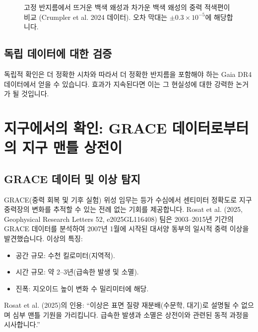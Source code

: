 \documentclass[11pt,a4paper]{article}
\begin{document}
	\begin{figure}[htbp]
		\centering
		\caption{고정 반지름에서 뜨거운 백색 왜성과 차가운 백색 왜성의 중력 적색편이 비교 (Crumpler et al. 2024 데이터). 오차 막대는 $\pm0.3\times10^{-5}$에 해당합니다.}
		\label{fig:wd-redshift}
	\end{figure}
	
	\subsection{독립 데이터에 대한 검증}
	\label{subsec:wd-verification}
	
	독립적 확인은 더 정확한 시차와 따라서 더 정확한 반지름을 포함해야 하는 Gaia DR4 데이터에서 얻을 수 있습니다. 효과가 지속된다면 이는 그 현실성에 대한 강력한 논거가 될 것입니다.
	
	\section{지구에서의 확인: GRACE 데이터로부터의 지구 맨틀 상전이}
	\label{sec:grace}
	
	\subsection{GRACE 데이터 및 이상 탐지}
	\label{subsec:grace-data}
	
	GRACE(중력 회복 및 기후 실험) 위성 임무는 등가 수심에서 센티미터 정확도로 지구 중력장의 변화를 추적할 수 있는 전례 없는 기회를 제공합니다. Rosat et al. (2025, Geophysical Research Letters 52, e2025GL116408) 팀은 2003–2015년 기간의 GRACE 데이터를 분석하여 2007년 1월에 시작된 대서양 동부의 일시적 중력 이상을 발견했습니다. 이상의 특징:
	\begin{itemize}
		\item 공간 규모: 수천 킬로미터(지역적).
		\item 시간 규모: 약 2–3년(급속한 발생 및 소멸).
		\item 진폭: 지오이드 높이 변화 수 밀리미터에 해당.
	\end{itemize}
	Rosat et al. (2025)의 인용: ``이상은 표면 질량 재분배(수문학, 대기)로 설명될 수 없으며 심부 맨틀 기원을 가리킵니다. 급속한 발생과 소멸은 상전이와 관련된 동적 과정을 시사합니다.''
	
\end{document}
